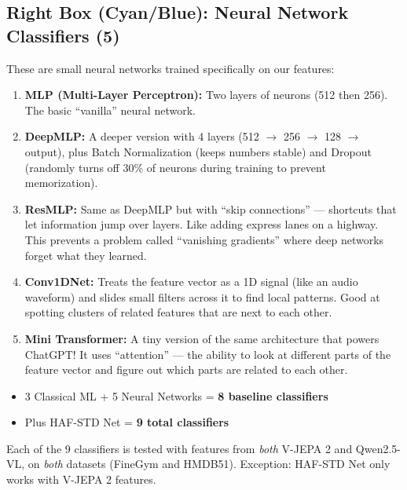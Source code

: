 \documentclass[12pt, a4paper]{article}
\begin{document}
\subsection{Right Box (Cyan/Blue): Neural Network Classifiers (5)}

\begin{keybox}
These are small neural networks trained specifically on our features:
\begin{enumerate}[leftmargin=1cm, itemsep=0.3cm]
    \item \textbf{MLP (Multi-Layer Perceptron):} Two layers of neurons (512 then 256). The basic ``vanilla'' neural network.
    
    \item \textbf{DeepMLP:} A deeper version with 4 layers (512 $\rightarrow$ 256 $\rightarrow$ 128 $\rightarrow$ output), plus Batch Normalization (keeps numbers stable) and Dropout (randomly turns off 30\% of neurons during training to prevent memorization).
    
    \item \textbf{ResMLP:} Same as DeepMLP but with ``skip connections'' — shortcuts that let information jump over layers. Like adding express lanes on a highway. This prevents a problem called ``vanishing gradients'' where deep networks forget what they learned.
    
    \item \textbf{Conv1DNet:} Treats the feature vector as a 1D signal (like an audio waveform) and slides small filters across it to find local patterns. Good at spotting clusters of related features that are next to each other.
    
    \item \textbf{Mini Transformer:} A tiny version of the same architecture that powers ChatGPT! It uses ``attention'' — the ability to look at different parts of the feature vector and figure out which parts are related to each other.
\end{enumerate}
\end{keybox}

\begin{summarybox}
\begin{itemize}
    \item 3 Classical ML + 5 Neural Networks = \textbf{8 baseline classifiers}
    \item Plus HAF-STD Net = \textbf{9 total classifiers}
\end{itemize}
Each of the 9 classifiers is tested with features from \textit{both} V-JEPA 2 and Qwen2.5-VL, on \textit{both} datasets (FineGym and HMDB51). Exception: HAF-STD Net only works with V-JEPA 2 features.
\end{summarybox}
\end{document}
